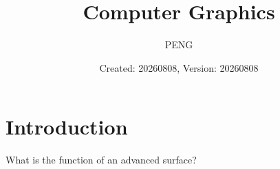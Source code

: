 \documentclass{article}
\title{Computer Graphics}
\author{PENG}
\date{Created: 20260808, Version: 20260808}
\begin{document}
\maketitle
\tableofcontents
\section{Introduction \cite{FOLEY_1996_COMPUTER_GRAPHICS_PRINCIPLES_AND_PRACTICE}}
What is the function of an advanced surface?

\printbibliography
\end{document}
